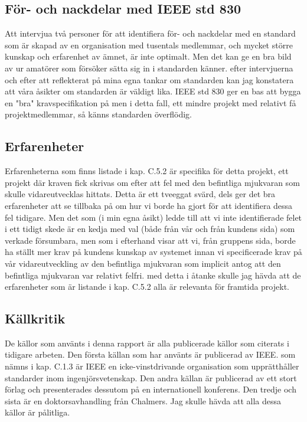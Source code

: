\subsection{För- och nackdelar med IEEE std 830}
Att intervjua två personer för att identifiera för- och nackdelar med en standard som är skapad av en organisation med tusentals medlemmar, och mycket större kunskap och erfarenhet av ämnet, är inte optimalt. Men det kan ge en bra bild av ur amatörer som försöker sätta sig in i standarden känner. efter intervjuerna och efter att reflekterat på mina egna tankar om standarden kan jag konstatera att våra åsikter om standarden är väldigt lika. IEEE std 830 ger en bas att bygga en "bra" kravspecifikation på men i detta fall, ett mindre projekt med relativt få projektmedlemmar, så känns standarden överflödig.   
\subsection{Erfarenheter}
Erfarenheterna som finns listade i kap. C.5.2 är specifika för detta projekt, ett projekt där kraven fick skrivas om efter att fel med den befintliga mjukvaran som skulle vidareutvecklas hittats. Detta är ett tveeggat svärd, dels ger det bra erfarenheter att se tillbaka på om hur vi borde ha gjort för att identifiera dessa fel tidigare. Men det som (i min egna åsikt) ledde till att vi inte identifierade felet i ett tidigt skede är en kedja med val (både från vår och från kundens sida) som verkade försumbara, men som i efterhand visar att vi, från gruppens sida, borde ha ställt mer krav på kundens kunskap av systemet innan vi specificerade krav på vår vidareutveckling av den befintliga mjukvaran som implicit antog att den befintliga mjukvaran var relativt felfri. med detta i åtanke skulle jag hävda att de erfarenheter som är listande i kap. C.5.2 alla är relevanta för framtida projekt.      
\subsection{Källkritik}
De källor som använts i denna rapport är alla publicerade källor som citerats i tidigare arbeten. Den första källan som har använts är publicerad av IEEE. som nämns i kap. C.1.3 är IEEE en icke-vinstdrivande organisation som upprätthåller standarder inom ingenjörsvetenskap. Den andra källan är publicerad av ett stort förlag och presenterades dessutom på en internationell konferens. Den tredje och sista är en doktorsavhandling från Chalmers. Jag skulle hävda att alla dessa källor är pålitliga.      
